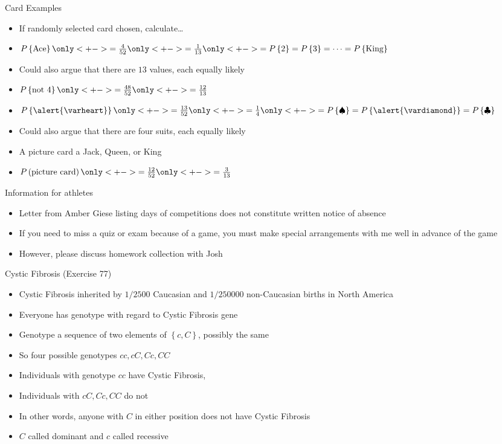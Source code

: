 \documentclass[handout]{beamer}
\theoremstyle{definition}
\begin{document}
\begin{frame}{Card Examples}
\begin{itemize}
\item If randomly selected card chosen, calculate\dots
\item $P\left\{\text{Ace}\right\}\only<+->{=\frac{4}{52}}
\only<+->{=\frac{1}{13}}
\only<+->{=P\left\{2\right\}=P\left\{3\right\}
=\cdots=P\left\{\text{King}\right\}}$
\item Could also argue that there are $13$ values, each equally likely
\item $P\left\{\text{not $4$}\right\}\only<+->{=\frac{48}{52}
\only<+->{=\frac{12}{13}}}$
\item $P\left\{\alert{\varheart}\right\}
\only<+->{=\frac{13}{52}}\only<+->{=\frac{1}{4}}
\only<+->{=P\left\{\spadesuit\right\}
=P\left\{\alert{\vardiamond}\right\}
=P\left\{\clubsuit\right\}}$
\item Could also argue that there are four suits, each equally likely
\item A \alert{picture card} a Jack, Queen, or King
\item $P\left(\text{picture card}\right)
\only<+->{=\frac{12}{52}}
\only<+->{=\frac{3}{13}}$
\end{itemize}
\end{frame}

\begin{frame}{Information for athletes}
\begin{itemize}
\item Letter from Amber Giese listing
days of competitions does \alert{not} constitute
written notice of absence
\item If you need to miss a quiz or exam because of a game, \alert{you must}
make special arrangements with me well in advance of the game
\item However, please discuss homework collection with Josh
\end{itemize}
\end{frame}

\begin{frame}{Cystic Fibrosis (Exercise 77)}
\begin{itemize}
\item Cystic Fibrosis inherited by $1/2500$ Caucasian
and $1/250000$ non-Caucasian births in North America
\item Everyone has \alert{genotype}
with regard to Cystic Fibrosis gene
\item \alert{Genotype} a sequence of two elements of
$\left\{c,C\right\}$, possibly the same
\item So four possible genotypes $cc,cC,Cc,CC$
\item Individuals with genotype $cc$ \alert{have} Cystic Fibrosis,
\item Individuals with $cC,Cc,CC$ do \alert{not}
\item In other words, anyone with $C$ in either position
does \alert{not} have Cystic Fibrosis
\item $C$ called \alert{dominant} and $c$ called \alert{recessive}
\end{itemize}
\end{frame}
\end{document}
